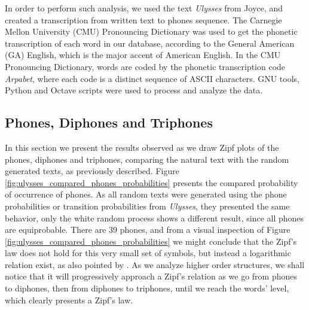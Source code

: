 In order to perform such analysis, we used the text \textit{Ulysses} from
Joyce, and created a transcription from written text to phones sequence. 
The Carnegie Mellon University (CMU) 
Pronouncing Dictionary \citep{cmu2008} was used to get the phonetic transcription of each word in our database,
according to the General American (GA) English, which is
the major accent of American English. 
In the CMU Pronouncing Dictionary, words are coded by the phonetic transcription code \textit{Arpabet},
where each code is a distinct sequence of ASCII characters.
GNU tools, Python and Octave scripts were used to process and analyze the data.


\subsection{Phones, Diphones and Triphones}
\label{sec:phones}
In this section we present the results observed as we draw Zipf plots of the phones, diphones and
triphones, comparing the natural text with the random generated texts, as previously described.
Figure \ref{fig:ulysses_compared_phones_probabilities} presents the compared probability of occurrence
of phones. As all random texts were generated using the phone probabilities or
transition probabilities from \textit{Ulysses}, they presented the same behavior, only the
white random process shows a different result, since all phones are equiprobable.
There are 39 phones, and from a visual inspection of Figure \ref{fig:ulysses_compared_phones_probabilities}
we might conclude that the Zipf's law does not hold for this very small set of symbols,
but instead a logarithmic relation exist, as also pointed by \cite{kanter1995}.
As we analyze higher order structures, we shall notice that it will progressively approach 
a Zipf's relation as we go from phones to diphones, then from diphones to triphones, until
we reach the words' level, which clearly presents a Zipf's law.


